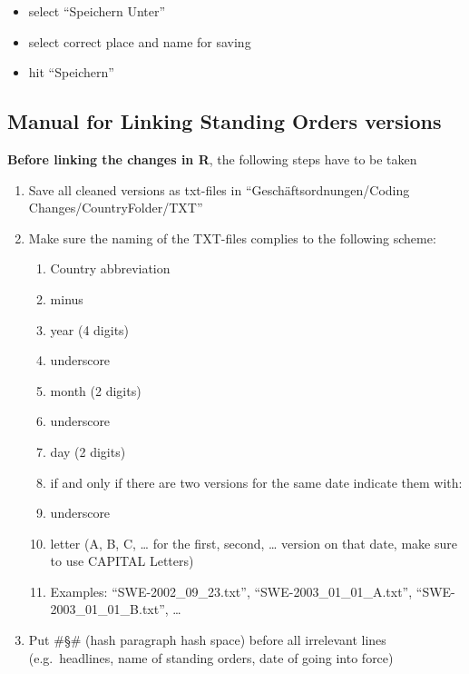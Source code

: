 \documentclass[10pt,]{article}
\providecommand{\tightlist}{%
  \setlength{\itemsep}{0pt}\setlength{\parskip}{0pt}}
\begin{document}
\begin{itemize}
  \begin{itemize}
  \tightlist
  \item
    select ``Speichern Unter''
  \item
    select correct place and name for saving
  \item
    hit ``Speichern''
  \end{itemize}
\end{itemize}

\newpage

\subsection{Manual for Linking Standing Orders
versions}\label{manual-for-linking-standing-orders-versions}

\textbf{Before linking the changes in R}, the following steps have to be
taken

\begin{enumerate}
\def\labelenumi{\arabic{enumi})}
\tightlist
\item
  Save all cleaned versions as txt-files in ``Geschäftsordnungen/Coding
  Changes/CountryFolder/TXT''
\item
  Make sure the naming of the TXT-files complies to the following
  scheme:

  \begin{enumerate}
  \def\labelenumii{\alph{enumii}.}
  \tightlist
  \item
    Country abbreviation
  \item
    minus
  \item
    year (4 digits)
  \item
    underscore
  \item
    month (2 digits)
  \item
    underscore
  \item
    day (2 digits)
  \item
    if and only if there are two versions for the same date indicate
    them with:
  \item
    underscore
  \item
    letter (A, B, C, \ldots{} for the first, second, \ldots{} version on
    that date, make sure to use CAPITAL Letters)
  \item
    Examples: ``SWE-2002\_09\_23.txt'', ``SWE-2003\_01\_01\_A.txt'',
    ``SWE-2003\_01\_01\_B.txt'', \ldots{}
  \end{enumerate}
\item
  Put \#§\# (hash paragraph hash space) before all irrelevant lines
  (e.g.~headlines, name of standing orders, date of going into force)
\end{enumerate}
\end{document}
